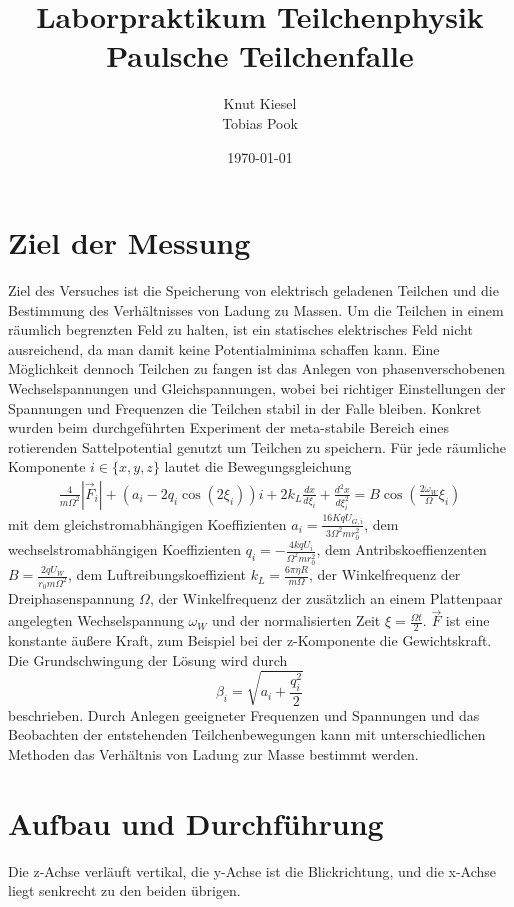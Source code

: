 \documentclass[a4paper,12pt]{article}
\title{Laborpraktikum Teilchenphysik\\ Paulsche Teilchenfalle}
\author{Knut Kiesel\\Tobias Pook}
\date{\today}
\begin{document}
\maketitle
\thispagestyle{empty}
\newpage
\tableofcontents
\setcounter{page}{1}
\newpage

\section{Ziel der Messung} %
Ziel des Versuches ist die Speicherung von elektrisch geladenen Teilchen und die Bestimmung des Verhältnisses von Ladung zu Massen.
Um die Teilchen in einem räumlich begrenzten Feld zu halten, ist ein statisches elektrisches Feld nicht ausreichend, da man damit keine Potentialminima schaffen kann.
Eine Möglichkeit dennoch Teilchen zu fangen ist das Anlegen von phasenverschobenen Wechselspannungen und Gleichspannungen, wobei bei richtiger Einstellungen der Spannungen und Frequenzen die Teilchen stabil in der Falle bleiben.
Konkret wurden beim durchgeführten Experiment der meta-stabile Bereich eines rotierenden Sattelpotential genutzt um Teilchen zu speichern.
Für jede räumliche Komponente $i\in\{x,y,z\}$ lautet die Bewegungsgleichung
\begin{align}\label{mastergleichung}
	\frac{4}{mΩ^2} |\vec{F}_i| + \left( a_i -2q_i \cos\left( 2\xi_i \right) \right) i  + 2k_L \frac{dx}{d\xi_i} + \frac{d^2x}{d\xi_i^2} = B\cos\left( \frac{2ω_W}{Ω}ξ_i \right)
\end{align}
mit dem gleichstromabhängigen Koeffizienten $a_i = \frac{16KqU_{G,i}}{3Ω^2mr_0^2}$,
dem wechselstromabhängigen Koeffizienten  $q_i = -\frac{4kqU_i}{Ω^2mr_0^2}$,
dem Antribskoeffienzenten $B = \frac{2qU_W}{r_0mΩ^2}$,
dem Luftreibungskoeffizient $k_L = \frac{6πηR}{mΩ}$, der Winkelfrequenz der Dreiphasenspannung $Ω$,
der Winkelfrequenz der zusätzlich an einem Plattenpaar angelegten Wechselspannung $ω_W$
und der normalisierten Zeit $ξ = \frac{Ωt}{2}$.
$\vec{F}$ ist eine konstante äußere Kraft, zum Beispiel bei der z-Komponente die Gewichtskraft.
Die Grundschwingung der Lösung wird durch
$$β_i = \sqrt{a_i + \frac{q_i^2}{2}}$$
beschrieben.
Durch Anlegen geeigneter Frequenzen und Spannungen und das Beobachten der entstehenden Teilchenbewegungen kann mit unterschiedlichen Methoden das Verhältnis von Ladung zur Masse bestimmt werden.


\section{Aufbau und Durchführung}
Die z-Achse verläuft vertikal, die y-Achse ist die Blickrichtung, und die x-Achse liegt senkrecht zu den beiden übrigen.
\end{document}

